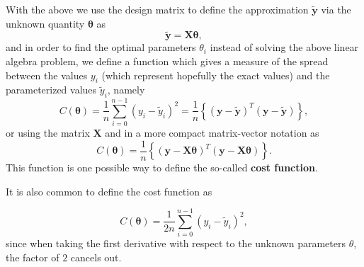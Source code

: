 \documentclass[%
oneside,                 %
final,                   %
10pt]{article}
\newenvironment{block_mdfboxadmon}[1][]{
\begin{block_mdfboxmdframed}[frametitle=#1]
}
{
\end{block_mdfboxmdframed}
}
\begin{document}

\begin{block_mdfboxadmon}[]
With the above we use the design matrix to define the approximation $\bm{\tilde{y}}$ via the unknown quantity $\bm{\theta}$ as
\[
\bm{\tilde{y}}= \bm{X}\bm{\theta},
\]
and in order to find the optimal parameters $\theta_i$ instead of solving the above linear algebra problem, we define a function which gives a measure of the spread between the values $y_i$ (which represent hopefully the exact values) and the parameterized values $\tilde{y}_i$, namely
\[
C(\bm{\theta})=\frac{1}{n}\sum_{i=0}^{n-1}\left(y_i-\tilde{y}_i\right)^2=\frac{1}{n}\left\{\left(\bm{y}-\bm{\tilde{y}}\right)^T\left(\bm{y}-\bm{\tilde{y}}\right)\right\},
\]
or using the matrix $\bm{X}$ and in a more compact matrix-vector notation as
\[
C(\bm{\theta})=\frac{1}{n}\left\{\left(\bm{y}-\bm{X}\bm{\theta}\right)^T\left(\bm{y}-\bm{X}\bm{\theta}\right)\right\}.
\]
This function is one possible way to define the so-called \textbf{cost function}.



It is also common to define
the cost function as

\[
C(\bm{\theta})=\frac{1}{2n}\sum_{i=0}^{n-1}\left(y_i-\tilde{y}_i\right)^2,
\]
since when taking the first derivative with respect to the unknown parameters $\theta$, the factor of $2$ cancels out.
\end{block_mdfboxadmon} %




\end{document}
